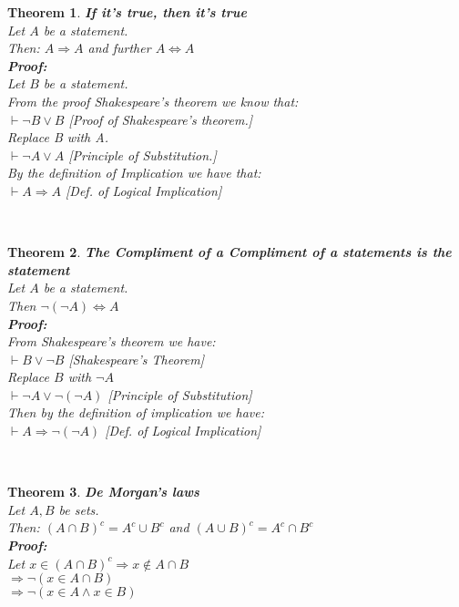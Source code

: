 \documentclass[12pt]{extarticle}
\theoremstyle{plain}
\newtheorem{thm}{Theorem}[section]
\theoremstyle{plain}
\theoremstyle{plain}
\theoremstyle{Definition}
\theoremstyle{Definition}
\theoremstyle{plain}
\newcommand{\cut}[0]{\noindent\framebox[\linewidth]{\rule{\linewidth}{2pt}}\\}
\begin{document}
\begin{thm} \textbf{If it's true, then it's true} \\ 
	Let $A$ be a statement. \\ 
	Then: $A \Rightarrow A$ and further $A \Leftrightarrow A$ \\
	\textbf{Proof: } \\
	Let $B$ be a statement. \\ 
	From the proof Shakespeare's theorem we know that: \\
	$\vdash \lnot B \lor B$ \hfill [Proof of Shakespeare's theorem.] \\ 
	Replace B with A. \\ 
	$\vdash \lnot A \lor A$ \hfill [Principle of Substitution.] \\
	By the definition of Implication we have that: \\ 
	$\vdash A \Rightarrow A$ \hfill [Def. of Logical Implication] 	
\end{thm}
\cut
\begin{thm} \textbf{The Compliment of a Compliment of a statements is the statement} \\
	Let $A$ be a statement. \\ 
	Then $\lnot(\lnot A) \Leftrightarrow A$ \\
	\textbf{Proof:} \\ 
	From Shakespeare's theorem we have: \\ 
	$\vdash B \lor \lnot B$ \hfill [Shakespeare's Theorem] \\ 
	Replace $B$ with $\lnot A$ \\ 
	$\vdash \lnot A \lor \lnot (\lnot A)$ \hfill [Principle of Substitution]\\ 
	Then by the definition of implication we have: \\ 
	$\vdash A \Rightarrow \lnot (\lnot A)$ \hfill [Def. of Logical Implication] \\
\end{thm}
\cut
\begin{thm} \textbf{De Morgan's laws} \\
	Let $A,B$ be sets. \\ 
	Then: $(A \cap B)^c = A^c \cup B^c$ and $(A \cup B)^c = A^c \cap B^c$ \\ 
	\textbf{Proof: } \\ 
	Let $x \in (A \cap B)^c \Rightarrow x \not \in A \cap B$ \\ 
	$\Rightarrow \lnot(x \in A \cap B)$ \\ 
	$\Rightarrow \lnot(x \in A \land x \in B)$  
\end{thm}
\end{document}
